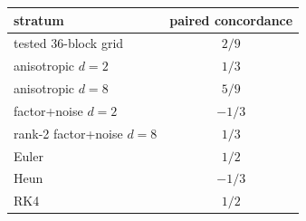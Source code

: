 \begin{tabular}{lc}
\toprule
stratum & paired concordance \\
\midrule
tested 36-block grid & $2/9$ \\
anisotropic $d=2$ & $1/3$ \\
anisotropic $d=8$ & $5/9$ \\
factor+noise $d=2$ & $-1/3$ \\
rank-2 factor+noise $d=8$ & $1/3$ \\
Euler & $1/2$ \\
Heun & $-1/3$ \\
RK4 & $1/2$ \\
\bottomrule
\end{tabular}
